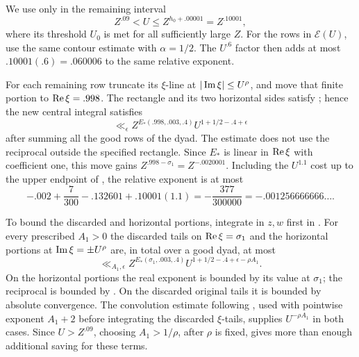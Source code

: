 We use  only in the remaining interval
\begin{equation}
 Z^{.09}<U\le Z^{h_0+.00001}=Z^{.10001},
\label{eq:intermediate-frequency-range}
\end{equation}
where its threshold \(U_0\) is met for all sufficiently large \(Z\).
For the rows in \(\mathcal E(U)\), use the same contour estimate with
\(\alpha=1/2\).  The \(U^{.6}\) factor then adds at most
\(.10001(.6)=.060006\) to the same relative exponent.

For each remaining row truncate its \(\xi\)-line at
\(|\operatorname{Im}\xi|\le U^\rho\), and move that finite portion to \(\operatorname{Re}\xi=.998\).
The rectangle and its two horizontal sides satisfy
; hence the new central integral satisfies
\begin{equation}
 \ll_\epsilon Z^{E_*(.998,.003,.4)}
                  U^{1+1/2-.4+\epsilon}
\label{eq:good-central-bound}
\end{equation}
after summing all the good rows of the dyad.  The estimate does not use
the reciprocal outside the specified rectangle.  Since \(E_*\) is linear
in \(\operatorname{Re}\xi\) with coefficient one, this move gains
\(Z^{.998-\sigma_1}=Z^{-.0020001}\).  Including the \(U^{1.1}\) cost
up to the upper endpoint of , the
relative exponent is at most
\begin{equation}
 -.002+\frac7{300}-.132601+.10001(1.1)
       =-\frac{377}{300000}=-.001256666666\ldots .
\label{eq:good-numerical-margin}
\end{equation}

To bound the discarded and horizontal portions, integrate in \(z,w\)
first in .  For every prescribed \(A_1>0\)
the discarded tails on \(\operatorname{Re}\xi=\sigma_1\) and the horizontal portions
at \(\operatorname{Im}\xi=\pm U^\rho\) are, in total over a good dyad, at most
\begin{equation}
 \ll_{A_1,\epsilon}
 Z^{E_*(\sigma_1,.003,.4)}
          U^{1+1/2-.4+\epsilon-\rho A_1}.
\label{eq:xi-tail-bound}
\end{equation}
On the horizontal portions the real exponent is bounded by its value
at \(\sigma_1\); the reciprocal is bounded by
.  On the discarded original tails it is
bounded by absolute convergence.  The convolution estimate following
, used with pointwise exponent \(A_1+2\)
before integrating the discarded \(\xi\)-tails, supplies \(U^{-\rho A_1}\)
in both cases.
Since \(U>Z^{.09}\), choosing \(A_1>1/\rho\), after \(\rho\) is fixed,
gives more than enough additional saving for these terms.

